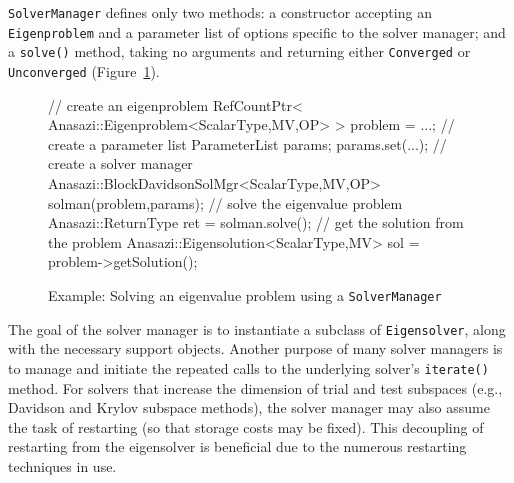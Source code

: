 \documentclass[acmtoms]{acmtrans2m}
\newcommand{\aspace}[1]{\texttt{#1}}
\begin{document}
\aspace{SolverManager} defines only two methods: a constructor
accepting an \aspace{Eigenproblem} and a parameter list of
options specific to the solver manager; and a \verb!solve()! method, taking no
arguments and returning either \aspace{Converged} or
\aspace{Unconverged} (Figure~\ref{fig:examplesolve}).

\begin{figure}[htb]
\begin{center}
\begin{boxedverbatim}
// create an eigenproblem
RefCountPtr< Anasazi::Eigenproblem<ScalarType,MV,OP> > problem = ...;
// create a parameter list
ParameterList params;
params.set(...);
// create a solver manager
Anasazi::BlockDavidsonSolMgr<ScalarType,MV,OP> solman(problem,params);
// solve the eigenvalue problem
Anasazi::ReturnType ret = solman.solve();
// get the solution from the problem
Anasazi::Eigensolution<ScalarType,MV> sol = problem->getSolution();
\end{boxedverbatim}
\end{center}
\caption{Example: Solving an eigenvalue problem using a
\aspace{SolverManager}}
\label{fig:examplesolve}
\end{figure}

The goal of the solver manager is to instantiate a subclass of \aspace{Eigensolver}, along
with the necessary support objects. Another purpose of many solver managers is to manage
and initiate the repeated calls to the underlying solver's \verb!iterate()! method. For
solvers that increase the dimension of trial and test subspaces (e.g., Davidson and Krylov
subspace methods), the solver manager may also assume the task of restarting (so that
storage costs may be fixed). This decoupling of restarting from the eigensolver is
beneficial due to the numerous restarting techniques in use.

\end{document}
